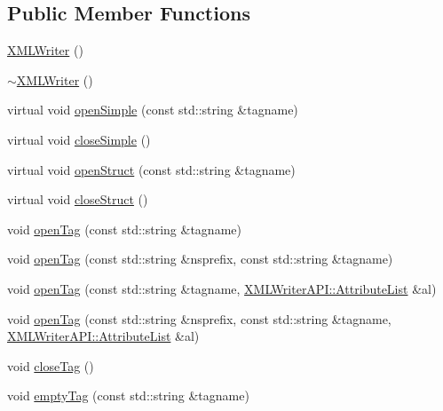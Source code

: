 \subsection*{Public Member Functions}
\begin{DoxyCompactItemize}
\item 
\mbox{\hyperlink{classADATXML_1_1XMLWriter_a42bd3e53ee25d35a1034938e1ad6912b}{X\+M\+L\+Writer}} ()
\item 
\mbox{\hyperlink{classADATXML_1_1XMLWriter_aaeb06e39b2a325fb8f33de0dc1fe66c2}{$\sim$\+X\+M\+L\+Writer}} ()
\item 
virtual void \mbox{\hyperlink{classADATXML_1_1XMLWriter_a5599aaa358e07c8c7a4b7a137ec3e43a}{open\+Simple}} (const std\+::string \&tagname)
\item 
virtual void \mbox{\hyperlink{classADATXML_1_1XMLWriter_ab8cdb27adc2f4d3b893b8234d13f9e70}{close\+Simple}} ()
\item 
virtual void \mbox{\hyperlink{classADATXML_1_1XMLWriter_a8f9728743acfd9c15ab5d69bf8800a5e}{open\+Struct}} (const std\+::string \&tagname)
\item 
virtual void \mbox{\hyperlink{classADATXML_1_1XMLWriter_ade5512a07806893fe3aaebb897580569}{close\+Struct}} ()
\item 
void \mbox{\hyperlink{classADATXML_1_1XMLWriter_a75da06c5e515ccd9d519501915f50a8f}{open\+Tag}} (const std\+::string \&tagname)
\item 
void \mbox{\hyperlink{classADATXML_1_1XMLWriter_aa65d48238c4b08ebcedd534501e7cbaa}{open\+Tag}} (const std\+::string \&nsprefix, const std\+::string \&tagname)
\item 
void \mbox{\hyperlink{classADATXML_1_1XMLWriter_a0d90742225631452502c6716ee737fef}{open\+Tag}} (const std\+::string \&tagname, \mbox{\hyperlink{namespaceXMLWriterAPI_a28cf3d8051a4ccf0aef208b7ebc66d07}{X\+M\+L\+Writer\+A\+P\+I\+::\+Attribute\+List}} \&al)
\item 
void \mbox{\hyperlink{classADATXML_1_1XMLWriter_a26795936be9ebee12c374fa82065ffb5}{open\+Tag}} (const std\+::string \&nsprefix, const std\+::string \&tagname, \mbox{\hyperlink{namespaceXMLWriterAPI_a28cf3d8051a4ccf0aef208b7ebc66d07}{X\+M\+L\+Writer\+A\+P\+I\+::\+Attribute\+List}} \&al)
\item 
void \mbox{\hyperlink{classADATXML_1_1XMLWriter_a13209ef7863272707bf8fea7c172e9f1}{close\+Tag}} ()
\item 
void \mbox{\hyperlink{classADATXML_1_1XMLWriter_a7749a56b9e15992d3168f808b2ad02c5}{empty\+Tag}} (const std\+::string \&tagname)
\item 

\end{DoxyCompactItemize}
